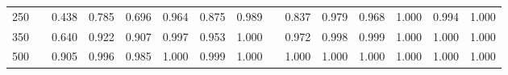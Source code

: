 % 
\begin{tabular}{ccccccccccccccc}
  \hline
  \hline
250 &  & 0.438 & 0.785 & 0.696 & 0.964 & 0.875 & 0.989 &  & 0.837 & 0.979 & 0.968 & 1.000 & 0.994 & 1.000 \\ 
  350 &  & 0.640 & 0.922 & 0.907 & 0.997 & 0.953 & 1.000 &  & 0.972 & 0.998 & 0.999 & 1.000 & 1.000 & 1.000 \\ 
  500 &  & 0.905 & 0.996 & 0.985 & 1.000 & 0.999 & 1.000 &  & 1.000 & 1.000 & 1.000 & 1.000 & 1.000 & 1.000 \\ 
   \hline
\end{tabular}
